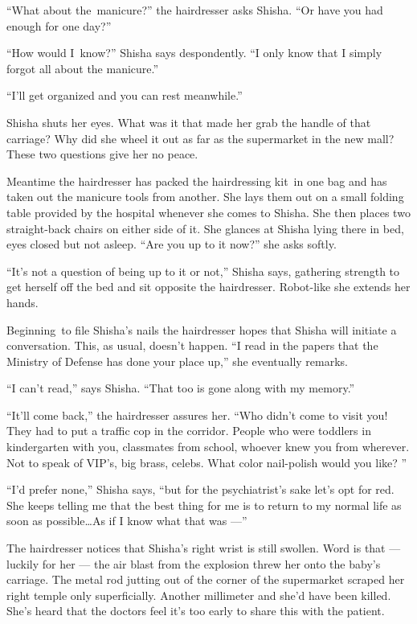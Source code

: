\documentclass[twoside,11pt,openany]{book}
\begin{document}
``What about the~manicure?'' the hairdresser asks Shisha. ``Or have you had
enough for one day?''

``How would I~know?'' Shisha says despondently. ``I only know that I simply
forgot all about the manicure.''

``I'll get organized and you can rest meanwhile.''

Shisha shuts her eyes. What was it that made her grab the handle of that carriage? Why did she wheel it out as far as
the supermarket in the new mall? These two questions give her no peace.

Meantime the hairdresser has packed the hairdressing kit~in one bag and has taken out the manicure tools from another.
She lays them out on a small folding table provided by the hospital whenever she comes to Shisha. She then places two
straight-back chairs on either side of it. She glances at Shisha lying there in bed, eyes closed but not asleep.
``Are you up to it now?'' she asks softly.

``It's not a question of being up to it or not,'' Shisha says, gathering strength to get
herself off the bed and sit opposite the hairdresser. Robot-like she extends her hands.

Beginning~to file Shisha's nails the hairdresser hopes that Shisha will initiate a conversation. This, as usual,
doesn't happen. ``I read in the papers that the Ministry of Defense has done your place up,''
she eventually remarks.

``I can't read,'' says Shisha. ``That too is gone along with my
memory.''

``It'll come back,'' the hairdresser assures her. ``Who didn't come to visit you!
They had to put a traffic cop in the corridor. People who were toddlers in kindergarten with you, classmates from
school, whoever knew you from wherever. Not to speak of VIP's, big brass, celebs. What color nail-polish would you
like? ''

``I'd{ }prefer none,'' Shisha says,
``but for the psychiatrist's sake let's opt for red. She keeps telling me that the best thing for me is to
return to my normal life as soon as possible{\ldots}As if I know what that was ---''

The hairdresser notices that Shisha's right wrist is still swollen. Word is that --- luckily for her --- the air blast from
the explosion threw her onto the baby's carriage. The metal rod jutting out of the corner of the supermarket scraped
her right temple only superficially. Another millimeter and she'd have been killed. She's heard that the doctors feel
it's too early to share this with the patient.
\end{document}
